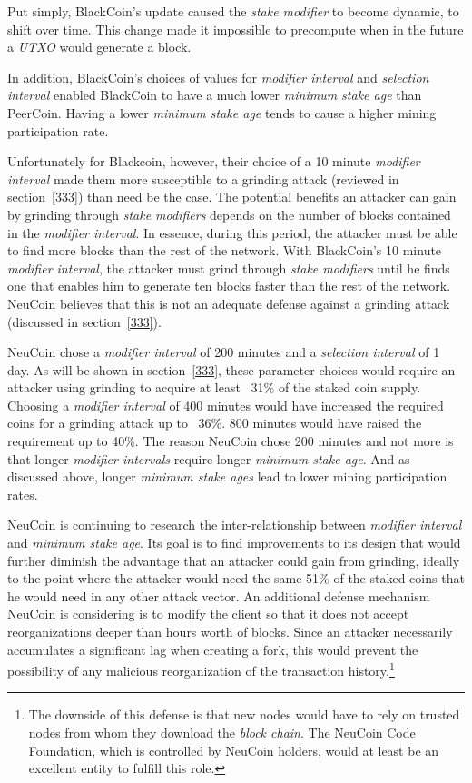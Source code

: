\documentclass[a4paper,11pt]{article}
\begin{document}
Put simply, BlackCoin's update caused the \textit{stake modifier} to become dynamic, to shift over time. This change made it impossible to precompute when in the future a \textit{UTXO} would generate a block. 

In addition, BlackCoin's choices of values for \textit{modifier interval} and \textit{selection interval} enabled BlackCoin to have a much lower \textit{minimum stake age} than PeerCoin. Having a lower \textit{minimum stake age} tends to cause a higher mining participation rate.

Unfortunately for Blackcoin, however, their choice of a 10 minute \textit{modifier interval} made them more susceptible to a grinding attack (reviewed in section~\ref{333}) than need be the case. The potential benefits an attacker can gain by grinding through \textit{stake modifiers} depends on the number of blocks contained in the \textit{modifier interval}. In essence, during this period, the attacker must be able to find more blocks than the rest of the network. With BlackCoin's 10 minute \textit{modifier interval}, the attacker must grind through \textit{stake modifiers} until he finds one that enables him to generate ten blocks faster than the rest of the network. NeuCoin believes that this is not an adequate defense against a grinding attack (discussed in section~\ref{333}).

NeuCoin chose a \textit{modifier interval} of 200 minutes and a \textit{selection interval} of 1 day. As will be shown in section~\ref{333}, these parameter choices would require an attacker using grinding to acquire at least ~31\% of the staked coin supply. Choosing a \textit{modifier interval} of 400 minutes would have increased the required coins for a grinding attack up to ~36\%. 800 minutes would have raised the requirement up to 40\%. The reason NeuCoin chose 200 minutes and not more is that longer \textit{modifier intervals} require longer \textit{minimum stake age}. And as discussed above, longer \textit{minimum stake ages} lead to lower mining participation rates.

NeuCoin is continuing to research the inter-relationship between \textit{modifier interval} and \textit{minimum stake age}. Its goal is to find improvements to its design that would further diminish the advantage that an attacker could gain from grinding, ideally to the point where the attacker would need the same 51\% of the staked coins that he would need in any other attack vector. An additional defense mechanism NeuCoin is considering is to modify the client so that it does not accept reorganizations deeper than  hours worth of blocks. Since an attacker necessarily accumulates a significant lag when creating a fork, this would prevent the possibility of any malicious reorganization of the transaction history.\footnote{The downside of this defense is that new nodes would have to rely on trusted nodes from whom they download the \textit{block chain}. The NeuCoin Code Foundation, which is controlled by NeuCoin holders, would at least be an excellent entity to fulfill this role.}
\end{document}
